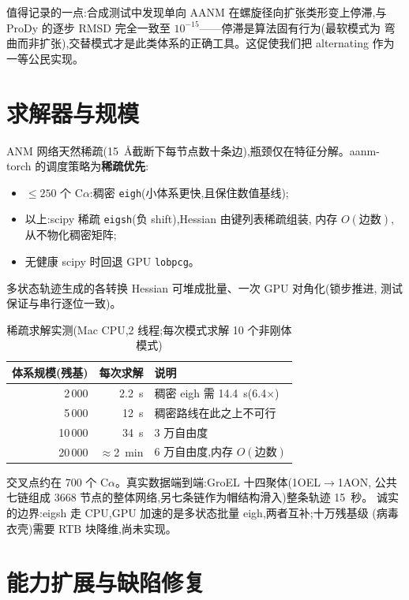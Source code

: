 \documentclass[11pt]{article}
\begin{document}
值得记录的一点:合成测试中发现单向 AANM 在螺旋径向扩张类形变上停滞,与
ProDy 的逐步 RMSD 完全一致至 $10^{-15}$——停滞是算法固有行为(最软模式为
弯曲而非扩张),交替模式才是此类体系的正确工具。这促使我们把 alternating
作为一等公民实现。

\section{求解器与规模}
\label{sec:solver}

ANM 网络天然稀疏(15~\AA 截断下每节点数十条边),瓶颈仅在特征分解。aanm-torch
的调度策略为\textbf{稀疏优先}:

\begin{itemize}[itemsep=1pt,topsep=2pt]
\item $\leq 250$ 个 C$\alpha$:稠密 \texttt{eigh}(小体系更快,且保住数值基线);
\item 以上:scipy 稀疏 \texttt{eigsh}(负 shift),Hessian 由键列表稀疏组装,
内存 $O(\text{边数})$,从不物化稠密矩阵;
\item 无健康 scipy 时回退 GPU \texttt{lobpcg}。
\end{itemize}

多状态轨迹生成的各转换 Hessian 可堆成批量、一次 GPU 对角化(锁步推进,
测试保证与串行逐位一致)。

\begin{table}[htbp]
\centering
\caption{稀疏求解实测(Mac CPU,2 线程;每次模式求解 10 个非刚体模式)}
\label{tab:bench}
\begin{tabular}{rrl}
\toprule
体系规模(残基) & 每次求解 & 说明 \\
\midrule
2\,000 & 2.2~s & 稠密 eigh 需 14.4~s(6.4$\times$) \\
5\,000 & 12~s & 稠密路线在此之上不可行 \\
10\,000 & 34~s & 3 万自由度 \\
20\,000 & $\approx$2~min & 6 万自由度,内存 $O(\text{边数})$ \\
\bottomrule
\end{tabular}
\end{table}

交叉点约在 700 个 C$\alpha$。真实数据端到端:GroEL 十四聚体(1OEL$\to$1AON,
公共七链组成 3668 节点的整体网络,另七条链作为帽结构滑入)整条轨迹 15~秒。
诚实的边界:eigsh 走 CPU,GPU 加速的是多状态批量 eigh,两者互补;十万残基级
(病毒衣壳)需要 RTB 块降维,尚未实现。

\section{能力扩展与缺陷修复}
\label{sec:ext}
\end{document}
